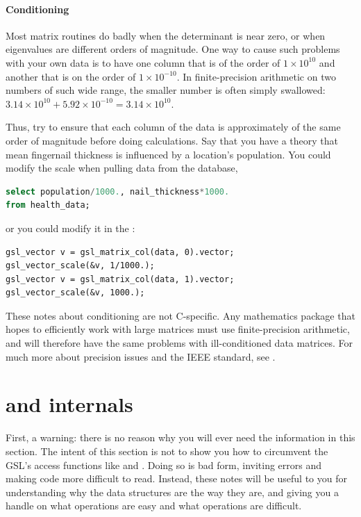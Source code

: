 \paragraph{Conditioning} Most matrix routines do badly when the
determinant is near zero, or when eigenvalues are different orders of magnitude.
One way to cause such problems with your own data is
to have one column that is of the order of $1 \times 10^{10}$ and
another that is on the order of $1 \times 10^{-10}$. In
finite-precision arithmetic on two numbers of such wide range, the
smaller number is often simply swallowed: $3.14 \times 10^{10} + 5.92
\times 10^{-10} = 3.14 \times 10^{10}$. 

Thus, try to ensure that each column of the data is
approximately of the same order of magnitude before doing calculations.
Say that you have a theory that mean fingernail thickness is influenced by
a location's population.
You could modify the scale when pulling data from the database,
\begin{lstlisting}[language=sql]
select population/1000., nail_thickness*1000.
from health_data;
\end{lstlisting}
or you could modify it in the :
\begin{lstlisting}
gsl_vector v = gsl_matrix_col(data, 0).vector;
gsl_vector_scale(&v, 1/1000.);
gsl_vector v = gsl_matrix_col(data, 1).vector;
gsl_vector_scale(&v, 1000.);
\end{lstlisting}

These notes about conditioning are not C-specific. Any mathematics
package that hopes to efficiently work with large matrices must use
finite-precision arithmetic, and will therefore have the same problems
with ill-conditioned data matrices. For much more about
precision issues and the IEEE standard, see \citet{goldberg:floating}.


\section{\treesymbol{}  and 
internals}\label{gslinternals}
First, a warning: there is no reason why you will ever need the
information in this section. 
The intent of this section is not to show you how to circumvent the
GSL's access functions like  and
. Doing so is bad form, inviting errors and making
code more difficult to read. Instead, these notes
will be useful to you for understanding why the data structures
are the way they are, and giving you a handle on what operations are
easy and what operations are difficult.

